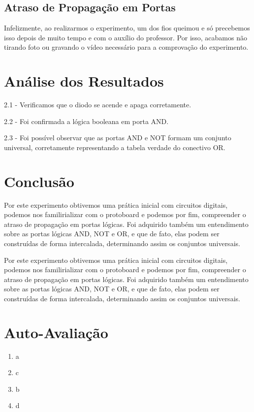 \documentclass[12pt]{article}
\begin{document}
\subsection{Atraso de Propagação em Portas}
\label{sec:atraso}

Infelizmente, ao realizarmos o experimento, um dos fios queimou e só precebemos isso depois de muito tempo e com o auxílio do professor. Por isso, acabamos não tirando foto ou gravando o vídeo necessário para a comprovação do experimento.

\section{Análise dos Resultados}
\label{sec:Resultados}

2.1 - Verificamos que o diodo se acende e apaga corretamente.

2.2 - Foi confirmada a lógica booleana em porta AND.

2.3 -  Foi possível observar que as portas AND e NOT formam um conjunto universal, corretamente representando a tabela verdade do conectivo OR.


\section{Conclusão}
\label{sec:Conclusao}
	Por este experimento obtivemos uma prática inicial com circuitos digitais, podemos nos familirializar com o protoboard e podemos por fim, compreender o atraso de propagação em portas  lógicas. 
	Foi adquirido também um entendimento sobre as portas lógicas AND, NOT e OR, e que de fato, elas podem ser construídas de forma intercalada, determinando assim os conjuntos universais.

Por este experimento obtivemos uma prática inicial com circuitos digitais, podemos nos familirializar com o protoboard e podemos por fim, compreender o atraso de propagação em portas  lógicas. 
Foi adquirido também um entendimento sobre as portas lógicas AND, NOT e OR, e que de fato, elas podem ser construídas de forma intercalada, determinando assim os conjuntos universais.






\newpage 
\section*{Auto-Avaliação}

\begin{enumerate}
    \item a
    \item c
    \item b
    \item d
\end{enumerate}
\end{document}

